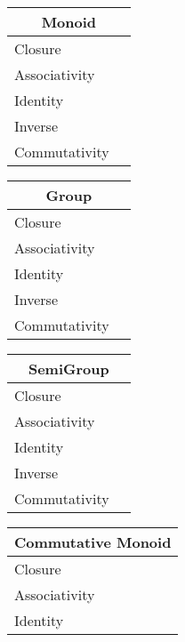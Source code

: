 \documentclass[a4paper,12pt]{scrartcl}    %
\begin{document}
\begin{landscape}
\begin{minipage}[t][]{0.60 \linewidth}
\begin{minipage}[c]{0,5\textwidth}
\begin{tabular}{|l|p{2cm}|}
			  \hline
			  \multicolumn{2}{c}{\cellcolor{yellow!25}Monoid} \\
			  \hline
			   \cellcolor{blue!25} Closure&  \\
			    \cellcolor{blue!25} Associativity&  \\
			    \cellcolor{blue!25} Identity&  \\
			    \cellcolor{red!25} Inverse&  \\
			    \cellcolor{red!25} Commutativity&  \\
			  \hline
			\end{tabular}
			\vfill
			\begin{tabular}{|l|p{2cm}|} %
			  \hline
			  \multicolumn{2}{c}{\cellcolor{yellow!25}Group} \\
			  \hline
			   \cellcolor{blue!25} Closure&  \\
			    \cellcolor{blue!25} Associativity&  \\
			    \cellcolor{blue!25} Identity&  \\
			    \cellcolor{blue!25} Inverse&  \\
			    \cellcolor{red!25} Commutativity&  \\
			  \hline
			\end{tabular}
		\end{minipage}
		\hspace{1cm}
		\begin{minipage}[c]{0,5\textwidth}	
\begin{tabular}{|l|p{2cm}|} %
			  \hline
			  \multicolumn{2}{c}{\cellcolor{yellow!25}SemiGroup} \\
			  \hline
			   \cellcolor{blue!25} Closure&  \\
			    \cellcolor{blue!25} Associativity&  \\
			    \cellcolor{red!25} Identity&  \\
			    \cellcolor{red!25} Inverse&  \\
			    \cellcolor{red!25} Commutativity&  \\
			  \hline
			\end{tabular}
			\vfill
			\begin{tabular}{|l|p{2cm}|} %
			  \hline
			  \multicolumn{2}{c}{\cellcolor{yellow!25}Commutative Monoid} \\
			  \hline
			   \cellcolor{blue!25} Closure&  \\
			    \cellcolor{blue!25} Associativity&  \\
			    \cellcolor{blue!25} Identity&  \\

\end{tabular}
\end{minipage}
\end{minipage}
\end{landscape}
\end{document}
